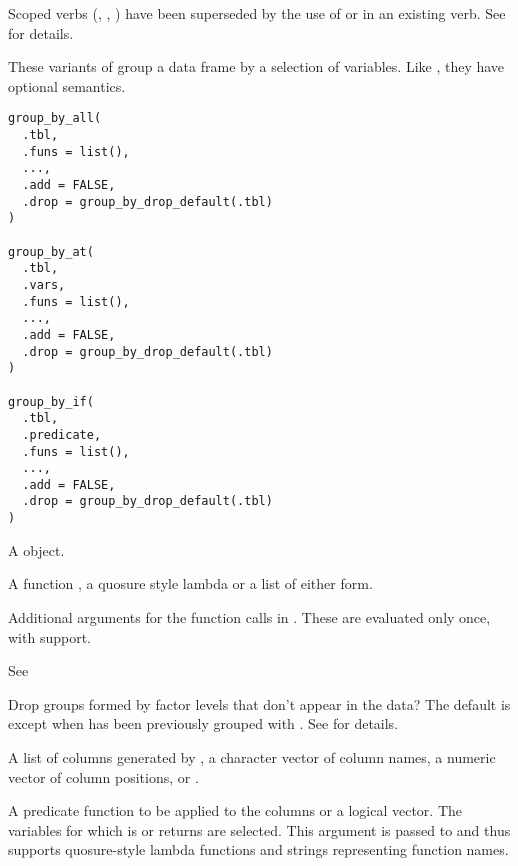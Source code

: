 \documentclass[a4paper]{book}
\begin{document}
%
\begin{Description}
\strong{[Superseded]}

Scoped verbs (, , ) have been superseded by the use of
 or  in an existing verb. See  for
details.

These  variants of  group a data frame by a
selection of variables. Like , they have optional
 semantics.
\end{Description}
%
\begin{Usage}
\begin{verbatim}
group_by_all(
  .tbl,
  .funs = list(),
  ...,
  .add = FALSE,
  .drop = group_by_drop_default(.tbl)
)

group_by_at(
  .tbl,
  .vars,
  .funs = list(),
  ...,
  .add = FALSE,
  .drop = group_by_drop_default(.tbl)
)

group_by_if(
  .tbl,
  .predicate,
  .funs = list(),
  ...,
  .add = FALSE,
  .drop = group_by_drop_default(.tbl)
)
\end{verbatim}
\end{Usage}
%
\begin{Arguments}
\begin{ldescription}
\item[\code{.tbl}] A  object.

\item[\code{.funs}] A function , a quosure style lambda  or a list of either form.

\item[\code{...}] Additional arguments for the function calls in
. These are evaluated only once, with  support.

\item[\code{.add}] See 

\item[\code{.drop}] Drop groups formed by factor levels that don't appear in the
data? The default is  except when  has been previously
grouped with . See  for details.

\item[\code{.vars}] A list of columns generated by ,
a character vector of column names, a numeric vector of column
positions, or .

\item[\code{.predicate}] A predicate function to be applied to the columns
or a logical vector. The variables for which  is or
returns  are selected. This argument is passed to
 and thus supports quosure-style lambda
functions and strings representing function names.
\end{ldescription}
\end{Arguments}
\end{document}
